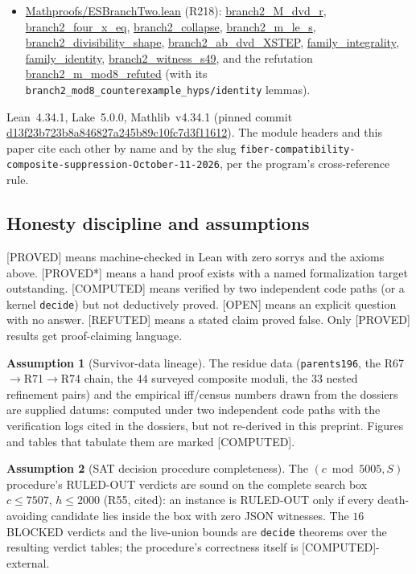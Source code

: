 \documentclass[11pt,a4paper]{article}
\theoremstyle{definition}
\newtheorem{assumption}{Assumption}
\begin{document}
\begin{itemize}
  \url{liveUnion_bound_6}, \url{liveUnion_bound_11},
  \url{unique_2cover}, \url{seven_minimal_3covers}, and the
  uniform theorems \url{no_tiling_fiber6},
  \texttt{no\_tiling\_fiber11}. The $94$ verdict table is
  [COMPUTED] data, kernel-checked only as given tables.
\item \url{Mathproofs/ESBranchTwo.lean} (R218):
  \url{branch2_M_dvd_r}, \url{branch2_four_x_eq},
  \url{branch2_collapse}, \url{branch2_m_le_s},
  \url{branch2_divisibility_shape},
  \url{branch2_ab_dvd_XSTEP}, \url{family_integrality},
  \url{family_identity}, \url{branch2_witness_s49}, and the
  refutation \url{branch2_m_mod8_refuted} (with its
  \texttt{branch2\_mod8\_counterexample\_hyps/identity} lemmas).
\end{itemize}
Lean~4.34.1, Lake~5.0.0, Mathlib~v4.34.1 (pinned commit
\url{d13f23b723b8a846827a245b89c10fc7d3f11612}). The module headers
and this paper cite each other by name and by the slug
\texttt{fiber-compatibility-composite-suppression-October-11-2026}, per
the program's cross-reference rule.

\subsection{Honesty discipline and assumptions}

[PROVED] means machine-checked in Lean with zero sorrys and the axioms
above. [PROVED*] means a hand proof exists with a named formalization
target outstanding. [COMPUTED] means verified by two independent code
paths (or a kernel \texttt{decide}) but not deductively proved. [OPEN]
means an explicit question with no answer. [REFUTED] means a stated claim
proved false. Only [PROVED] results get proof-claiming language.

\begin{assumption}[Survivor-data lineage]
  \label{asm:data}
  The residue data (\texttt{parents196}, the R67$\to$R71$\to$R74 chain,
  the $44$ surveyed composite moduli, the $33$ nested refinement pairs)
  and the empirical iff/census numbers drawn from the dossiers are
  supplied datums: computed under two independent code paths with the
  verification logs cited in the dossiers, but not re-derived in this
  preprint. Figures and tables that tabulate them are marked [COMPUTED].
\end{assumption}

\begin{assumption}[SAT decision procedure completeness]
  \label{asm:sat}
  The $(c\bmod5005,S)$ procedure's RULED-OUT verdicts are sound on the
  complete search box $c\le7507$, $h\le2000$ (R55, cited): an instance is
  RULED-OUT only if every death-avoiding candidate lies inside the box
  with zero JSON witnesses. The $16$ BLOCKED verdicts and the live-union
  bounds are \texttt{decide} theorems over the resulting verdict tables;
  the procedure's correctness itself is [COMPUTED]-external.
\end{assumption}
\end{document}
